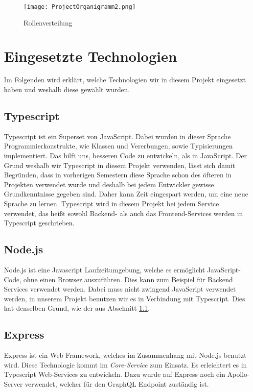     \begin{figure}[!hbt]
        \texttt{[image: ProjectOrganigramm2.png]}
        \caption{Rollenverteilung}
        \label{fig:Rollenverteilung}
    \end{figure}
    
\section{Eingesetzte Technologien}
Im Folgenden wird erklärt, welche Technologien wir in diesem Projekt eingesetzt haben und weshalb diese gewählt wurden.

\subsection{Typescript} \label{sub:Typescript}
    Typescript ist ein Superset von JavaScript. Dabei wurden in dieser Sprache Programmierkonstrukte, wie Klassen und Vererbungen, sowie Typisierungen implementiert. Das hilft uns, besseren Code zu entwickeln, als in JavaScript.
    Der Grund weshalb wir Typescript in diesem Projekt verwenden, lässt sich damit Begründen, dass in vorherigen Semestern diese Sprache schon des öfteren in Projekten verwendet wurde und deshalb bei jedem Entwickler gewisse Grundkenntnisse
    gegeben sind. Daher kann Zeit eingespart werden, um eine neue Sprache zu lernen. Typescript wird in diesem Projekt bei jedem Service verwendet, das heißt sowohl Backend- als auch das Frontend-Services werden in Typescript geschrieben.
\subsection{Node.js}
    Node.js ist eine Javascript Laufzeitumgebung, welche es ermöglicht JavaScript-Code, ohne einen Browser auszuführen. Dies kann zum Beispiel für Backend Services verwendet werden. Dabei muss nicht zwingend JavaScript verwendet werden,
    in unserem Projekt benutzen wir es in Verbindung mit Typescript. Dies hat denselben Grund, wie der aus Abschnitt \ref{sub:Typescript}.
\subsection{Express}
    Express ist ein Web-Framework, welches im Zusammenhang mit Node.js benutzt wird. Diese Technologie kommt im \textit{Core-Service} zum Einsatz. Es erleichtert es in Typescript Web-Services zu entwickeln.
    Dazu wurde auf Express noch ein Apollo-Server verwendet, welcher für den GraphQL Endpoint zuständig ist.
